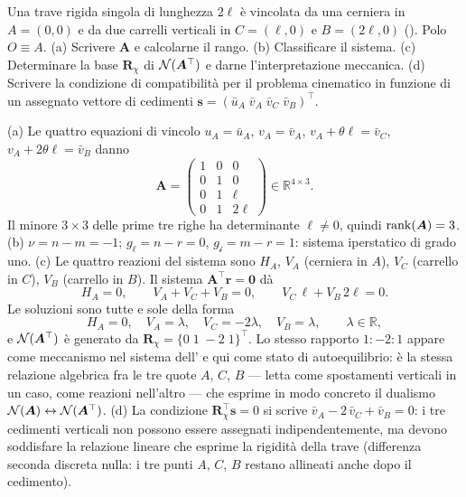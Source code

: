 


\begin{esercizio}
	\label{ex:C05_trave_continua}
	
	Una trave rigida singola di lunghezza $2\ell$ è vincolata da una
	cerniera in $A=(0,0)$ e da due carrelli verticali in $C=(\ell,0)$
	e $B=(2\ell,0)$ (). Polo $O\equiv A$.
	(a) Scrivere $\bm{A}$ e calcolarne il rango.
	(b) Classificare il sistema. (c) Determinare la base
	$\bm{R}_\chi$ di $\mathcal{N}(\bm{A}^\top)$ e darne l'interpretazione
	meccanica. (d) Scrivere la condizione di compatibilità per il
	problema cinematico in funzione di un assegnato vettore di
	cedimenti $\bm{s}=(\bar{u}_A\;\bar{v}_A\;\bar{v}_C\;\bar{v}_B)^\top$.
	
	\risultato (a) Le quattro equazioni di vincolo
	$u_A=\bar{u}_A$, $v_A=\bar{v}_A$, $v_A+\theta\ell=\bar{v}_C$,
	$v_A+2\theta\ell=\bar{v}_B$ danno
	\[
	\bm{A}=
	\begin{pmatrix}
		1 & 0 & 0\\
		0 & 1 & 0\\
		0 & 1 & \ell\\
		0 & 1 & 2\ell
	\end{pmatrix}
	\in\mathbb{R}^{4\times 3}.
	\]
	Il minore $3\times 3$ delle prime tre righe ha determinante
	$\ell\neq 0$, quindi $\operatorname{rank}(\bm{A})=3$.
	(b) $\nu=n-m=-1$; $g_\ell=n-r=0$, $g_{\mathscr{i}}=m-r=1$:
	sistema iperstatico di grado uno.
	(c) Le quattro reazioni del sistema sono $H_A$, $V_A$ (cerniera
	in $A$), $V_C$ (carrello in $C$), $V_B$ (carrello in $B$). Il
	sistema $\bm{A}^\top\bm{r}=\bm{0}$ dà
	\[
	H_A = 0,
	\qquad V_A + V_C + V_B = 0,
	\qquad V_C\,\ell + V_B\,2\ell = 0.
	\]
	Le soluzioni sono tutte e sole della forma
	\[
	H_A = 0,
	\quad V_A = \lambda,
	\quad V_C = -2\lambda,
	\quad V_B = \lambda,
	\qquad \lambda\in\mathbb{R},
	\]
	e $\mathcal{N}(\bm{A}^\top)$ è generato da
	$\bm{R}_\chi=\{0\;1\;-2\;1\}^\top$. Lo stesso rapporto $1:-2:1$
	appare come meccanismo nel sistema
	dell' e qui come stato di
	autoequilibrio: è la stessa relazione algebrica fra le tre quote
	$A$, $C$, $B$ --- letta come spostamenti verticali in un caso,
	come reazioni nell'altro --- che esprime in modo concreto il
	dualismo $\mathcal{N}(\bm{A}) \leftrightarrow \mathcal{N}(\bm{A}^\top)$.
	(d) La condizione $\bm{R}_\chi^\top\bm{s}=0$ si scrive
	$\bar{v}_A - 2\,\bar{v}_C + \bar{v}_B = 0$: i tre cedimenti
	verticali non possono essere assegnati indipendentemente, ma
	devono soddisfare la relazione lineare che esprime la rigidità
	della trave (differenza seconda discreta nulla: i tre punti
	$A$, $C$, $B$ restano allineati anche dopo il cedimento).
\end{esercizio}